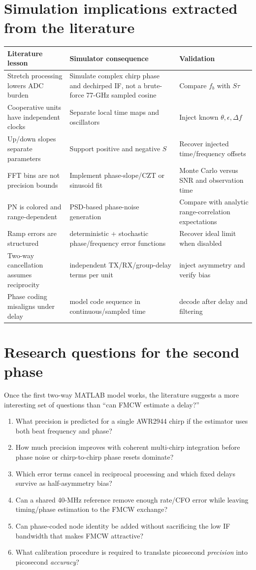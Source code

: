\documentclass[11pt]{article}
\begin{document}
\section{Simulation implications extracted from the literature}
\begin{longtable}{@{}p{}p{}p{}@{}}
\toprule Literature lesson & Simulator consequence & Validation \\ \midrule
Stretch processing lowers ADC burden & Simulate complex chirp phase and dechirped IF, not a brute-force 77-GHz sampled cosine & Compare $f_b$ with $S\tau$ \\
Cooperative units have independent clocks & Separate local time maps and oscillators & Inject known $\theta,\epsilon,\Delta f$ \\
Up/down slopes separate parameters & Support positive and negative $S$ & Recover injected time/frequency offsets \\
FFT bins are not precision bounds & Implement phase-slope/CZT or sinusoid fit & Monte Carlo versus SNR and observation time \\
PN is colored and range-dependent & PSD-based phase-noise generation & Compare with analytic range-correlation expectations \\
Ramp errors are structured & deterministic + stochastic phase/frequency error functions & Recover ideal limit when disabled \\
Two-way cancellation assumes reciprocity & independent TX/RX/group-delay terms per unit & inject asymmetry and verify bias \\
Phase coding misaligns under delay & model code sequence in continuous/sampled time & decode after delay and filtering \\
\bottomrule
\end{longtable}

\section{Research questions for the second phase}
Once the first two-way MATLAB model works, the literature suggests a more interesting set of questions than ``can FMCW estimate a delay?''
\begin{enumerate}
\item What precision is predicted for a single AWR2944 chirp if the estimator uses both beat frequency and phase?
\item How much precision improves with coherent multi-chirp integration before phase noise or chirp-to-chirp phase resets dominate?
\item Which error terms cancel in reciprocal processing and which fixed delays survive as half-asymmetry bias?
\item Can a shared 40-MHz reference remove enough rate/CFO error while leaving timing/phase estimation to the FMCW exchange?
\item Can phase-coded node identity be added without sacrificing the low IF bandwidth that makes FMCW attractive?
\item What calibration procedure is required to translate picosecond \emph{precision} into picosecond \emph{accuracy}?
\end{enumerate}
\end{document}
